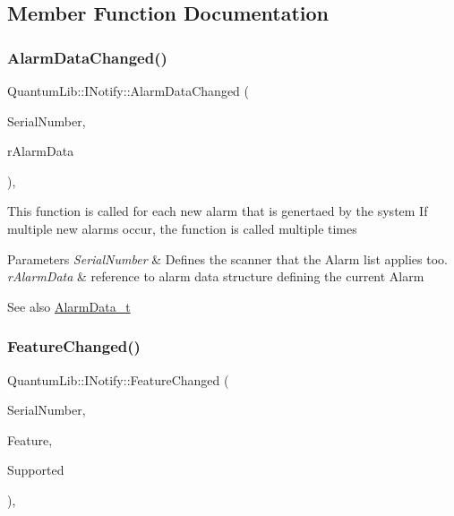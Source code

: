 \subsection{Member Function Documentation}
\mbox{\label{class_quantum_lib_1_1_i_notify_ab336885c5d718ed5bbe1eaab959bf880}} 
\subsubsection{\texorpdfstring{Alarm\+Data\+Changed()}{AlarmDataChanged()}}
{\footnotesize\ttfamily Quantum\+Lib\+::\+I\+Notify\+::\+Alarm\+Data\+Changed (\begin{DoxyParamCaption}\item[{uint32\+\_\+t}]{Serial\+Number,  }\item[{\mbox{\hyperlink{struct_quantum_lib_1_1_alarm_data__t}{Quantum\+Lib\+::\+Alarm\+Data\+\_\+t}} \&}]{r\+Alarm\+Data }\end{DoxyParamCaption})\hspace{0.3cm}{\ttfamily [inline]}, {\ttfamily [virtual]}}

This function is called for each new alarm that is genertaed by the system If multiple new alarms occur, the function is called multiple times 
\begin{DoxyParams}{Parameters}
{\em Serial\+Number} & Defines the scanner that the Alarm list applies too. \\
\hline
{\em r\+Alarm\+Data} & reference to alarm data structure defining the current Alarm \\
\hline
\end{DoxyParams}
\begin{DoxySeeAlso}{See also}
\mbox{\hyperlink{struct_quantum_lib_1_1_alarm_data__t}{Alarm\+Data\+\_\+t}} 
\end{DoxySeeAlso}
\mbox{\label{class_quantum_lib_1_1_i_notify_ae92378ad5ad3bdee002306a0723a5565}} 
\subsubsection{\texorpdfstring{Feature\+Changed()}{FeatureChanged()}}
{\footnotesize\ttfamily Quantum\+Lib\+::\+I\+Notify\+::\+Feature\+Changed (\begin{DoxyParamCaption}\item[{uint32\+\_\+t}]{Serial\+Number,  }\item[{\mbox{\hyperlink{namespace_quantum_lib_a10da739314e0c51341b3d5d059ead777}{e\+Features\+\_\+t}}}]{Feature,  }\item[{bool}]{Supported }\end{DoxyParamCaption})\hspace{0.3cm}{\ttfamily [inline]}, {\ttfamily [virtual]}}

